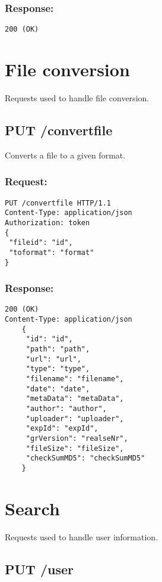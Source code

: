 \subsubsection*{Response:}
\begin{verbatim}
200 (OK)
\end{verbatim}

\section*{File conversion}

Requests used to handle file conversion.

\subsection*{PUT /convertfile}

Converts a file to a given format.

\subsubsection*{Request:}
\begin{verbatim}
PUT /convertfile HTTP/1.1
Content-Type: application/json
Authorization: token
{ 
 "fileid": "id", 
 "toformat": "format"
}
\end{verbatim}

\subsubsection*{Response:} 
\begin{verbatim}
200 (OK)
Content-Type: application/json
    {
     "id": "id",
     "path": "path",
     "url": "url",
     "type": "type",
     "filename": "filename",
     "date": "date",
     "metaData": "metaData",
     "author": "author",
     "uploader": "uploader",
     "expId": "expId",
     "grVersion": "realseNr",
     "fileSize": "fileSize",
     "checkSumMD5": "checkSumMD5"
    }
\end{verbatim}

\section*{Search}

Requests used to handle user information.

\subsection*{PUT /user}

